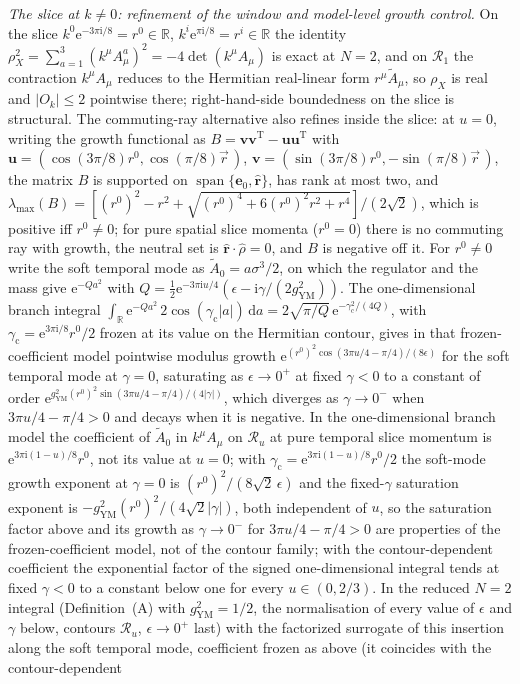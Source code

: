 \emph{The slice at \(k\ne0\): refinement of the window and model-level growth control.} On the slice \(k^0\mathrm e^{-3\pi\mathrm i/8}=r^0\in\mathbb R\), \(k^i\mathrm e^{\pi\mathrm i/8}=r^i\in\mathbb R\) the identity \(\rho_X^2=\sum_{a=1}^{3}{(k^\mu A^a_\mu)}^2=-4\det(k^\mu A_\mu)\) is exact at \(N=2\), and on \(\mathcal R_1\) the contraction \(k^\mu A_\mu\) reduces to the Hermitian real-linear form \(r^\mu\tilde A_\mu\), so \(\rho_X\) is real and \(|O_k|\le2\) pointwise there; right-hand-side boundedness on the slice is structural. The commuting-ray alternative also refines inside the slice: at \(u=0\), writing the growth functional as \(B=\mathbf v\mathbf v^{\mathrm T}-\mathbf u\mathbf u^{\mathrm T}\) with \(\mathbf u=(\cos(3\pi/8)r^0,\cos(\pi/8)\vec r\,)\), \(\mathbf v=(\sin(3\pi/8)r^0,-\sin(\pi/8)\vec r\,)\), the matrix \(B\) is supported on \(\operatorname{span}\{\mathbf e_0,\hat{\mathbf r}\}\), has rank at most two, and \(\lambda_{\max}(B)=[{(r^0)}^2-r^2+\sqrt{{(r^0)}^4+6{(r^0)}^2r^2+r^4}]/(2\sqrt2)\), which is positive iff \(r^0\ne0\); for pure spatial slice momenta (\(r^0=0\)) there is no commuting ray with growth, the neutral set is \(\hat{\mathbf r}\cdot\hat\rho=0\), and \(B\) is negative off it. For \(r^0\ne0\) write the soft temporal mode as \(\tilde A_0=a\sigma^3/2\), on which the regulator and the mass give \(\mathrm e^{-Qa^2}\) with \(Q=\tfrac12\mathrm e^{-3\pi\mathrm iu/4}(\epsilon-\mathrm i\gamma/(2g_{\mathrm{YM}}^2))\). The one-dimensional branch integral \(\int_{\mathbb R}\mathrm e^{-Qa^2}\,2\cos(\gamma_{\mathrm c}|a|)\,\mathrm da=2\sqrt{\pi/Q}\,\mathrm e^{-\gamma_{\mathrm c}^2/(4Q)}\), with \(\gamma_{\mathrm c}=\mathrm e^{3\pi\mathrm i/8}r^0/2\) frozen at its value on the Hermitian contour, gives in that frozen-coefficient model pointwise modulus growth \(\mathrm e^{{(r^0)}^2\cos(3\pi u/4-\pi/4)/(8\epsilon)}\) for the soft temporal mode at \(\gamma=0\), saturating as \(\epsilon\to0^+\) at fixed \(\gamma<0\) to a constant of order \(\mathrm e^{g_{\mathrm{YM}}^2{(r^0)}^2\sin(3\pi u/4-\pi/4)/(4|\gamma|)}\), which diverges as \(\gamma\to0^-\) when \(3\pi u/4-\pi/4>0\) and decays when it is negative. In the one-dimensional branch model the coefficient of \(\tilde A_0\) in \(k^\mu A_\mu\) on \(\mathcal R_u\) at pure temporal slice momentum is \(\mathrm e^{3\pi\mathrm i(1-u)/8}r^0\), not its value at \(u=0\); with \(\gamma_{\mathrm c}=\mathrm e^{3\pi\mathrm i(1-u)/8}r^0/2\) the soft-mode growth exponent at \(\gamma=0\) is \({(r^0)}^2/(8\sqrt2\,\epsilon)\) and the fixed-\(\gamma\) saturation exponent is \(-g_{\mathrm{YM}}^2{(r^0)}^2/(4\sqrt2|\gamma|)\), both independent of \(u\), so the saturation factor above and its growth as \(\gamma\to0^-\) for \(3\pi u/4-\pi/4>0\) are properties of the frozen-coefficient model, not of the contour family; with the contour-dependent coefficient the exponential factor of the signed one-dimensional integral tends at fixed \(\gamma<0\) to a constant below one for every \(u\in(0,2/3)\). In the reduced \(N=2\) integral (Definition~(A) with \(g_{\mathrm{YM}}^2=1/2\), the normalisation of every value of \(\epsilon\) and \(\gamma\) below, contours \(\mathcal R_u\), \(\epsilon\to0^+\) last) with the factorized surrogate of this insertion along the soft temporal mode, coefficient frozen as above (it coincides with the contour-dependent 